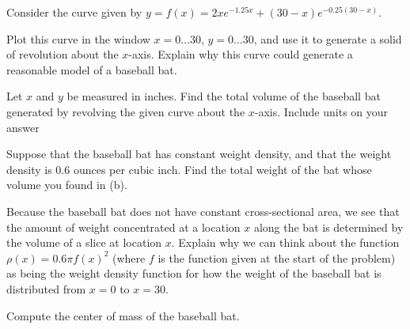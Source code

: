 \begin{exercises}
  \item Consider the curve given by $y = f(x) = 2xe^{-1.25x} + (30-x) e^{-0.25(30-x)}$.
  \ba
  	\item Plot this curve in the window $x = 0 \ldots 30$, $y = 0 \ldots 30$, and use it to generate a solid of revolution about the $x$-axis.  Explain why this curve could generate a reasonable model of a baseball bat.
	\item Let $x$ and $y$ be measured in inches.  Find the total volume of the baseball bat generated by revolving the given curve about the $x$-axis.  Include units on your answer
	\item Suppose that the baseball bat has constant weight density, and that the weight density is 0.6 ounces per cubic inch.  Find the total weight of the bat whose volume you found in (b).
	\item Because the baseball bat does not have constant cross-sectional area, we see that the amount of weight concentrated at a location $x$ along the bat is determined by the volume of a slice at location $x$.  Explain why we can think about the function $\rho(x) = 0.6 \pi f(x)^2$ (where $f$ is the function given at the start of the problem) as being the weight density function for how the weight of the baseball bat is distributed from $x = 0$ to $x = 30$.
	\item Compute the center of mass of the baseball bat.  
  \ea
  
\end{exercises}
\afterexercises
